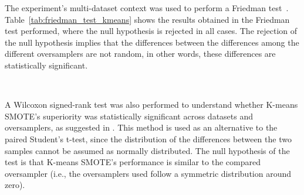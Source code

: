 The experiment's multi-dataset context was used to perform a Friedman
test~\cite{Friedman1937}. Table~\ref{tab:friedman_test_kmeans} shows the results
obtained in the Friedman test performed, where the null hypothesis is rejected
in all cases. The rejection of the null hypothesis implies that the
differences between the differences among the different oversamplers are not
random, in other words, these differences are statistically significant.

\begin{table}[ht]
    \centering
    \caption[Results for Friedman test.]{%
        Results for Friedman test. Statistical significance is tested at a
        level of $\alpha = 0.05$. The null hypothesis is that there is no
        difference in the classification outcome across oversamplers.
    }~\label{tab:friedman_test_kmeans}
\end{table}

A Wilcoxon signed-rank test \cite{Wilcoxon1945} was also performed to
understand whether K-means SMOTE's superiority was statistically significant
across datasets and oversamplers, as suggested in \cite{Demsar2006}. This
method is used as an alternative to the paired Student's t-test, since the
distribution of the differences between the two samples cannot be assumed as
normally distributed. The null hypothesis of the test is that K-means SMOTE's
performance is similar to the compared oversampler (i.e., the oversamplers
used follow a symmetric distribution around zero).

\begin{table}
    \centering
    \caption[\textit{p-values} of the Wilcoxon signed-rank test.]{%
        \textit{p-values} of the Wilcoxon signed-rank test. Boldface values
        are statistically significant at a significance level of $\alpha =
        0.05$.
    }~\label{tab:wilcoxon_test_kmeans}
\end{table}


